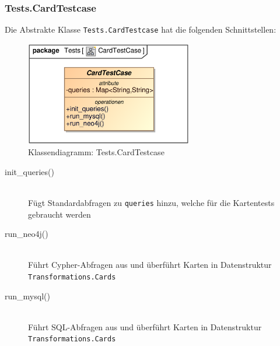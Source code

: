 \subsubsection{Tests.CardTestcase}
Die Abstrakte Klasse \verb|Tests.CardTestcase| hat die folgenden Schnittstellen:
\begin{figure}[H]
    \myfloatalign
    \includegraphics[width=0.65\textwidth]{gfx/MtGDeepAnalysis/CardTestcase.eps}
    \caption{Klassendiagramm: Tests.CardTestcase}
    \label{fig:class:tests.CardTestcase}
\end{figure}
\begin{description}
    \item[init\_queries()] \hfill \\
    Fügt Standardabfragen zu \verb|queries| hinzu, welche für die Kartentests gebraucht werden
        
    \item[run\_neo4j()] \hfill \\
    Führt Cypher-Abfragen aus und überführt Karten in Datenstruktur \verb|Transformations.Cards|
    
    \item[run\_mysql()] \hfill \\
    Führt SQL-Abfragen aus und überführt Karten in Datenstruktur \verb|Transformations.Cards|
\end{description}

